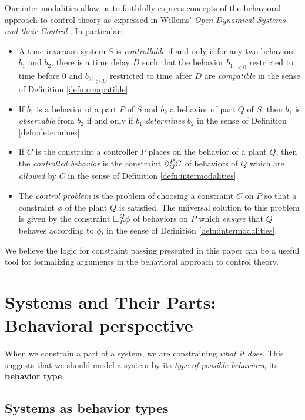 Our inter-modalities allow us to faithfully express concepts of the behavioral
approach to control theory as expressed in Willems' \emph{Open Dynamical Systems
and their Control} \cite{Willems:1998a}. In particular:
\begin{itemize}
\item A time-invariant system $S$ is \emph{controllable} if and only if for any
  two behaviors $b_1$ and $b_2$, there is a time delay $D$ such that the behavior
  $b_1|_{<0}$ restricted to time before $0$ and $b_2|_{>D}$ restricted to time
  after $D$ are \emph{compatible} in the sense of Definition \ref{defn:compatible}.
\item If $b_1$ is a behavior of a part $P$ of $S$ and $b_2$ a behavior of part
  $Q$ of $S$, then $b_1$ is \emph{observable} from $b_2$ if and only if $b_1$
  \emph{determines} $b_2$ in the sense of Definition \ref{defn:determines}.
\item If $C$ is the constraint a controller $P$ places on the behavior of a plant
  $Q$, then the \emph{controlled behavior} is the constraint $\allows{P}{Q}C$ of
  behaviors of $Q$ which are \emph{allowed} by $C$ in the sense of Definition
  \ref{defn:intermodalities}.
\item The \emph{control problem} is the problem of choosing a constraint $C$ on
  $P$ so that a constraint $\phi$ of the plant $Q$ is satisfied. The universal
  solution to this problem is given by the constraint $\ensure{Q}{P} \phi$ of
  behaviors on $P$ which \emph{ensure} that $Q$ behaves according to $\phi$, in
  the sense of Definition \ref{defn:intermodalities}.
\end{itemize}
We believe the logic for constraint passing presented in this paper can be a
useful tool for formalizing arguments in the behavioral approach to control theory.

\section{Systems and Their Parts: Behavioral perspective}

When we constrain a part of a system, we are constraining \emph{what it does}. This suggests that we should model a system by its \emph{type of possible behaviors}, its \textbf{behavior type}.

\subsection{Systems as behavior types}

